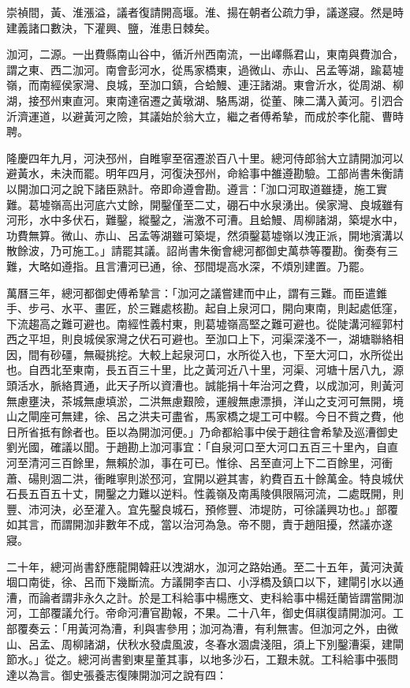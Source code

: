 崇禎間，黃、淮漲溢，議者復請開高堰。淮、揚在朝者公疏力爭，議遂寢。然是時建義諸口數決，下灌興、鹽，淮患日棘矣。

泇河，二源。一出費縣南山谷中，循沂州西南流，一出嶧縣君山，東南與費泇合，謂之東、西二泇河。南會彭河水，從馬家橋東，過微山、赤山、呂孟等湖，踰葛墟嶺，而南經侯家灣、良城，至泇口鎮，合蛤鰻、連汪諸湖。東會沂水，從周湖、柳湖，接邳州東直河。東南達宿遷之黃墩湖、駱馬湖，從董、陳二溝入黃河。引泗合沂濟運道，以避黃河之險，其議始於翁大立，繼之者傅希摯，而成於李化龍、曹時聘。

隆慶四年九月，河決邳州，自睢寧至宿遷淤百八十里。總河侍郎翁大立請開泇河以避黃水，未決而罷。明年四月，河復決邳州，命給事中雒遵勘驗。工部尚書朱衡請以開泇口河之說下諸臣熟計。帝即命遵會勘。遵言：「泇口河取道雖捷，施工實難。葛墟嶺高出河底六丈餘，開鑿僅至二丈，硼石中水泉湧出。侯家灣、良城雖有河形，水中多伏石，難鑿，縱鑿之，湍激不可漕。且蛤鰻、周柳諸湖，築堤水中，功費無算。微山、赤山、呂孟等湖雖可築堤，然須鑿葛墟嶺以洩正派，開地濱溝以散餘波，乃可施工。」請罷其議。詔尚書朱衡會總河都御史萬恭等覆勘。衡奏有三難，大略如遵指。且言漕河已通，徐、邳間堤高水深，不煩別建置。乃罷。

萬曆三年，總河都御史傅希摯言：「泇河之議嘗建而中止，謂有三難。而臣遣錐手、步弓、水平、畫匠，於三難處核勘。起自上泉河口，開向東南，則起處低窪，下流趨高之難可避也。南經性義村東，則葛墟嶺高堅之難可避也。從陡溝河經郭村西之平坦，則良城侯家灣之伏石可避也。至泇口上下，河渠深淺不一，湖塘聯絡相因，間有砂礓，無礙挑挖。大較上起泉河口，水所從入也，下至大河口，水所從出也。自西北至東南，長五百三十里，比之黃河近八十里，河渠、河塘十居八九，源頭活水，脈絡貫通，此天子所以資漕也。誠能捐十年治河之費，以成泇河，則黃河無慮壅決，茶城無慮填淤，二洪無慮艱險，運艘無慮漂損，洋山之支河可無開，境山之閘座可無建，徐、呂之洪夫可盡省，馬家橋之堤工可中輟。今日不貲之費，他日所省抵有餘者也。臣以為開泇河便。」乃命都給事中侯于趙往會希摯及巡漕御史劉光國，確議以聞。于趙勘上泇河事宜：「自泉河口至大河口五百三十里內，自直河至清河三百餘里，無賴於泇，事在可已。惟徐、呂至直河上下二百餘里，河衝蕭、碭則涸二洪，衝睢寧則淤邳河，宜開以避其害，約費百五十餘萬金。特良城伏石長五百五十丈，開鑿之力難以逆料。性義嶺及南禹陵俱限隔河流，二處既開，則豐、沛河決，必至灌入。宜先鑿良城石，預修豐、沛堤防，可徐議興功也。」部覆如其言，而謂開泇非數年不成，當以治河為急。帝不閱，責于趙阻擾，然議亦遂寢。

二十年，總河尚書舒應龍開韓莊以洩湖水，泇河之路始通。至二十五年，黃河決黃堌口南徙，徐、呂而下幾斷流。方議開李吉口、小浮橋及鎮口以下，建閘引水以通漕，而論者謂非永久之計。於是工科給事中楊應文、吏科給事中楊廷蘭皆謂當開泇河，工部覆議允行。帝命河漕官勘報，不果。二十八年，御史佴祺復請開泇河。工部覆奏云：「用黃河為漕，利與害參用；泇河為漕，有利無害。但泇河之外，由微山、呂孟、周柳諸湖，伏秋水發虞風波，冬春水涸虞淺阻，須上下別鑿漕渠，建閘節水。」從之。總河尚書劉東星董其事，以地多沙石，工艱未就。工科給事中張問達以為言。御史張養志復陳開泇河之說有四：

